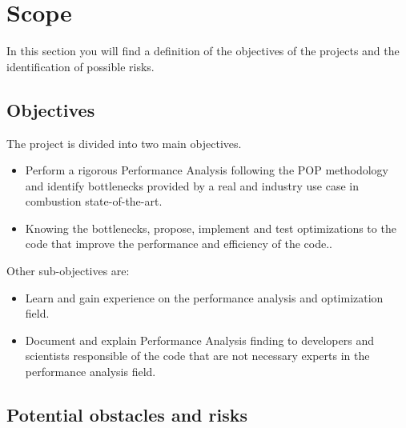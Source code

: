 \section{Scope}
\justify
In this section you will find a definition of the objectives of the projects and the identification of possible risks.
\subsection{Objectives}\label{sec:objectives}

\justify
The project is divided into two main objectives.
\begin{itemize}
  \item Perform a rigorous Performance Analysis following the POP methodology and identify bottlenecks provided by a real and industry use case in combustion state-of-the-art.
  \item Knowing the bottlenecks, propose, implement and test optimizations to the code that improve the performance and efficiency of the code..
\end{itemize}

\justify
Other sub-objectives are:
\begin{itemize}
  \item Learn and gain experience on the performance analysis and optimization field.
  \item Document and explain Performance Analysis finding to developers and scientists responsible of the code that are not necessary experts in the performance analysis field.  
\end{itemize}

\subsection{Potential obstacles and risks}

